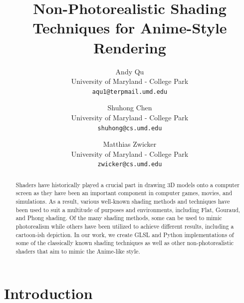 \documentclass[10pt,twocolumn,letterpaper]{article}
\begin{document}
\title{Non-Photorealistic Shading Techniques for Anime-Style Rendering}

\author{Andy Qu\\
University of Maryland - College Park\\
{\tt\small aqu1@terpmail.umd.edu}
\and
Shuhong Chen\\
University of Maryland - College Park\\
{\tt\small shuhong@cs.umd.edu}
\and
Matthias Zwicker\\
University of Maryland - College Park\\
{\tt\small zwicker@cs.umd.edu}
}
\maketitle

\begin{abstract}
Shaders have historically played a crucial part in drawing 3D models onto a computer screen as they have been an important component in computer games, movies, and simulations. As a result, various well-known shading methods and techniques have been used to suit a multitude of purposes and environments, including Flat, Gouraud, and Phong shading. Of the many shading methods, some can be used to mimic photorealism while others have been utilized to achieve different results, including a cartoon-ish depiction. In our work, we create GLSL and Python implementations of some of the classically known shading techniques as well as other non-photorealistic shaders that aim to mimic the Anime-like style.
\end{abstract}

\section{Introduction}
\label{sec:intro}
\end{document}
